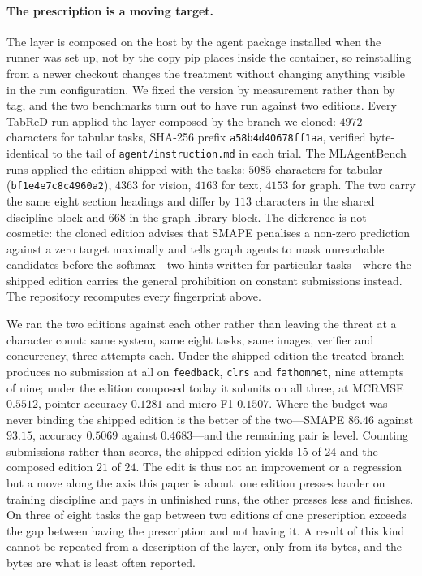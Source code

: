 \paragraph{The prescription is a moving target.} The layer is composed on the
host by the agent package installed when the runner was set up, not by the copy
pip places inside the container, so reinstalling from a newer checkout changes
the treatment without changing anything visible in the run configuration. We
fixed the version by measurement rather than by tag, and the two benchmarks turn
out to have run against two editions. Every TabReD run applied the layer composed
by the branch we cloned: $4972$ characters for tabular tasks, SHA-256 prefix
\texttt{a58b4d40678ff1aa}, verified byte-identical to the tail of
\texttt{agent/instruction.md} in each trial. The MLAgentBench runs applied the
edition shipped with the tasks: $5085$ characters for tabular
(\texttt{bf1e4e7c8c4960a2}), $4363$ for vision, $4163$ for text, $4153$ for
graph. The two carry the same eight section headings and differ by $113$
characters in the shared discipline block and $668$ in the graph library block.
The difference is not cosmetic: the cloned edition advises that SMAPE penalises a
non-zero prediction against a zero target maximally and tells graph agents to
mask unreachable candidates before the softmax---two hints written for particular
tasks---where the shipped edition carries the general prohibition on constant
submissions instead. The repository recomputes every fingerprint above.

We ran the two editions against each other rather than leaving the threat at a
character count: same system, same eight tasks, same images, verifier and
concurrency, three attempts each. Under the shipped edition the treated branch
produces no submission at all on \texttt{feedback}, \texttt{clrs} and
\texttt{fathomnet}, nine attempts of nine; under the edition composed today it
submits on all three, at MCRMSE $0.5512$, pointer accuracy $0.1281$ and micro-F1
$0.1507$. Where the budget was never binding the shipped edition is the better of
the two---SMAPE $86.46$ against $93.15$, accuracy $0.5069$ against
$0.4683$---and the remaining pair is level. Counting submissions rather than
scores, the shipped edition yields $15$ of $24$ and the composed edition $21$ of
$24$. The edit is thus not an improvement or a regression but a move along the
axis this paper is about: one edition presses harder on training discipline and
pays in unfinished runs, the other presses less and finishes. On three of eight
tasks the gap between two editions of one prescription exceeds the gap between
having the prescription and not having it. A result of this kind cannot be
repeated from a description of the layer, only from its bytes, and the bytes are
what is least often reported.

